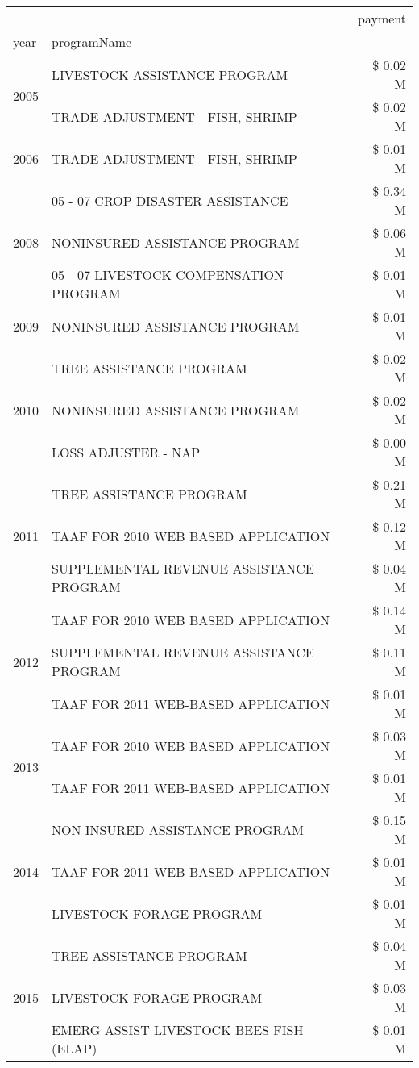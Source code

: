 \begin{tabular}{llr}
\toprule
 &  & payment \\
year & programName &  \\
\midrule
\multirow[t]{2}{*}{2005} & LIVESTOCK ASSISTANCE PROGRAM & \$ 0.02 M \\
 & TRADE ADJUSTMENT - FISH, SHRIMP & \$ 0.02 M \\
\cline{1-3}
2006 & TRADE ADJUSTMENT - FISH, SHRIMP & \$ 0.01 M \\
\cline{1-3}
\multirow[t]{3}{*}{2008} & 05 - 07 CROP DISASTER ASSISTANCE & \$ 0.34 M \\
 & NONINSURED ASSISTANCE PROGRAM & \$ 0.06 M \\
 & 05 - 07 LIVESTOCK COMPENSATION PROGRAM & \$ 0.01 M \\
\cline{1-3}
2009 & NONINSURED ASSISTANCE PROGRAM & \$ 0.01 M \\
\cline{1-3}
\multirow[t]{3}{*}{2010} & TREE ASSISTANCE PROGRAM & \$ 0.02 M \\
 & NONINSURED ASSISTANCE PROGRAM & \$ 0.02 M \\
 & LOSS ADJUSTER - NAP & \$ 0.00 M \\
\cline{1-3}
\multirow[t]{3}{*}{2011} & TREE ASSISTANCE PROGRAM & \$ 0.21 M \\
 & TAAF FOR 2010 WEB BASED APPLICATION & \$ 0.12 M \\
 & SUPPLEMENTAL REVENUE ASSISTANCE PROGRAM & \$ 0.04 M \\
\cline{1-3}
\multirow[t]{3}{*}{2012} & TAAF FOR 2010 WEB BASED APPLICATION & \$ 0.14 M \\
 & SUPPLEMENTAL REVENUE ASSISTANCE PROGRAM & \$ 0.11 M \\
 & TAAF FOR 2011 WEB-BASED APPLICATION & \$ 0.01 M \\
\cline{1-3}
\multirow[t]{2}{*}{2013} & TAAF FOR 2010 WEB BASED APPLICATION & \$ 0.03 M \\
 & TAAF FOR 2011 WEB-BASED APPLICATION & \$ 0.01 M \\
\cline{1-3}
\multirow[t]{3}{*}{2014} & NON-INSURED ASSISTANCE PROGRAM & \$ 0.15 M \\
 & TAAF FOR 2011 WEB-BASED APPLICATION & \$ 0.01 M \\
 & LIVESTOCK FORAGE PROGRAM & \$ 0.01 M \\
\cline{1-3}
\multirow[t]{3}{*}{2015} & TREE ASSISTANCE PROGRAM & \$ 0.04 M \\
 & LIVESTOCK FORAGE PROGRAM & \$ 0.03 M \\
 & EMERG ASSIST LIVESTOCK BEES FISH (ELAP) & \$ 0.01 M \\

\end{tabular}
